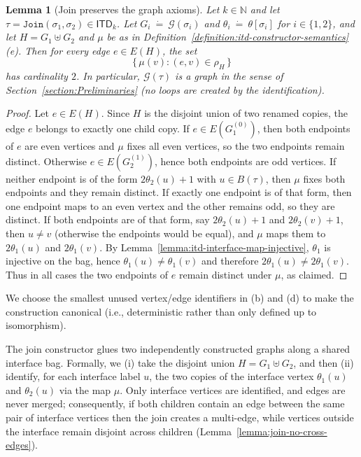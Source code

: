 \documentclass[11pt,a4paper]{article}
\newtheorem{lemma}[theorem]{Lemma}
\newcommand{\treewidthvalue}{k}
\newcommand{\decompositiongraph}[1]{\mathcal{G}(#1)}
\newcommand{\N}{\mathbb{N}}
\newcommand{\edgeset}[1]{E(#1)}
\newcommand{\incidencerelationname}{\rho}
\newcommand{\incidencerelation}[1]{\incidencerelationname_{#1}}
\newcommand{\anedge}{e}
\newcommand{\jointype}{\mathtt{Join}}
\newcommand{\topbagname}{B}
\newcommand{\topbag}[1]{\topbagname(#1)}
\newcommand{\allabstractdecompositionstreewidth}[1]{\mathsf{ITD}_{#1}}
\newcommand{\abstractdecomposition}{\tau}
\newcommand{\sigmaabstractdecomposition}{\sigma}
\newcommand{\defeq}{~\dot{=}~}
\newcommand{\topmapname}{\theta}
\newcommand{\topmap}[1]{\topmapname[#1]}
\begin{document}
\begin{lemma}[Join preserves the graph axioms]
\label{lemma:join-preserves-graph-axioms}
Let $\treewidthvalue\in \N$ and let $\abstractdecomposition=\jointype(\sigmaabstractdecomposition_1,\sigmaabstractdecomposition_2)\in \allabstractdecompositionstreewidth{\treewidthvalue}$.
Let $G_i\defeq \decompositiongraph{\sigmaabstractdecomposition_i}$ and $\theta_i\defeq \topmap{\sigmaabstractdecomposition_i}$ for $i\in\{1,2\}$, and let $H=G_1\uplus G_2$ and $\mu$ be as in Definition~\ref{definition:itd-constructor-semantics}(e).
Then for every edge $\anedge\in \edgeset{H}$, the set
\[
\{\,\mu(v) : (\anedge,v)\in \incidencerelation{H}\,\}
\]
has cardinality $2$. In particular, $\decompositiongraph{\abstractdecomposition}$ is a graph in the sense of Section~\ref{section:Preliminaries} (no loops are created by the identification).
\end{lemma}
\begin{proof}
Let $\anedge\in \edgeset{H}$. Since $H$ is the disjoint union of two renamed copies, the edge $\anedge$ belongs to exactly one child copy.
If $\anedge\in \edgeset{G_1^{(0)}}$, then both endpoints of $\anedge$ are even vertices and $\mu$ fixes all even vertices, so the two endpoints remain distinct.
Otherwise $\anedge\in \edgeset{G_2^{(1)}}$, hence both endpoints are odd vertices.
If neither endpoint is of the form $2\theta_2(u)+1$ with $u\in \topbag{\abstractdecomposition}$, then $\mu$ fixes both endpoints and they remain distinct.
If exactly one endpoint is of that form, then one endpoint maps to an even vertex and the other remains odd, so they are distinct.
If both endpoints are of that form, say $2\theta_2(u)+1$ and $2\theta_2(v)+1$, then $u\neq v$ (otherwise the endpoints would be equal), and $\mu$ maps them to $2\theta_1(u)$ and $2\theta_1(v)$.
By Lemma~\ref{lemma:itd-interface-map-injective}, $\theta_1$ is injective on the bag, hence $\theta_1(u)\neq \theta_1(v)$ and therefore $2\theta_1(u)\neq 2\theta_1(v)$.
Thus in all cases the two endpoints of $\anedge$ remain distinct under $\mu$, as claimed.
\end{proof}

\noindent
We choose the smallest unused vertex/edge identifiers in (b) and (d) to make the construction canonical (i.e., deterministic rather than only defined up to isomorphism).

The join constructor glues two independently constructed graphs along a shared interface bag.
Formally, we (i) take the disjoint union $H=G_1\uplus G_2$, and then (ii) identify, for each interface label $u$, the two copies of the interface vertex $\theta_1(u)$ and $\theta_2(u)$ via the map $\mu$.
Only interface vertices are identified, and edges are never merged; consequently, if both children contain an edge between the same pair of interface vertices then the join creates a multi-edge, while vertices outside the interface remain disjoint across children (Lemma~\ref{lemma:join-no-cross-edges}).
\end{document}
